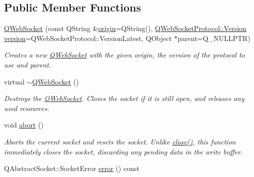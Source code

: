 \subsection*{Public Member Functions}
\begin{DoxyCompactItemize}
\item 
\mbox{\hyperlink{class_q_web_socket_a1dd87330154f6f06e63b3904ccb3aabe}{Q\+Web\+Socket}} (const Q\+String \&\mbox{\hyperlink{class_q_web_socket_af03bb3ce5ec1bcab0882e29fd3e62961}{origin}}=Q\+String(), \mbox{\hyperlink{namespace_q_web_socket_protocol_ad53f2684577effe0a517eadb48714df3}{Q\+Web\+Socket\+Protocol\+::\+Version}} \mbox{\hyperlink{class_q_web_socket_a691b38b043dfa8295242b39e04d2c0e7}{version}}=Q\+Web\+Socket\+Protocol\+::\+Version\+Latest, Q\+Object $\ast$parent=Q\+\_\+\+N\+U\+L\+L\+P\+TR)
\begin{DoxyCompactList}\small\item\em Creates a new \mbox{\hyperlink{class_q_web_socket}{Q\+Web\+Socket}} with the given {\itshape origin}, the {\itshape version} of the protocol to use and {\itshape parent}. \end{DoxyCompactList}\item 
\mbox{\label{class_q_web_socket_a7c8fadd9fbc92bb1a1d8ecac45a3e526}} 
virtual \mbox{\hyperlink{class_q_web_socket_a7c8fadd9fbc92bb1a1d8ecac45a3e526}{$\sim$\+Q\+Web\+Socket}} ()
\begin{DoxyCompactList}\small\item\em Destroys the \mbox{\hyperlink{class_q_web_socket}{Q\+Web\+Socket}}. Closes the socket if it is still open, and releases any used resources. \end{DoxyCompactList}\item 
\mbox{\label{class_q_web_socket_a37f91d8d8c8df94bbcdd97c03e28c3f7}} 
void \mbox{\hyperlink{class_q_web_socket_a37f91d8d8c8df94bbcdd97c03e28c3f7}{abort}} ()
\begin{DoxyCompactList}\small\item\em Aborts the current socket and resets the socket. Unlike \mbox{\hyperlink{class_q_web_socket_ae1c9af16e7f53666ccd423864b8e2c35}{close()}}, this function immediately closes the socket, discarding any pending data in the write buffer. \end{DoxyCompactList}\item 
Q\+Abstract\+Socket\+::\+Socket\+Error \mbox{\hyperlink{class_q_web_socket_a98e9ba3091c73531678a55982f954dae}{error}} () const

\end{DoxyCompactItemize}
